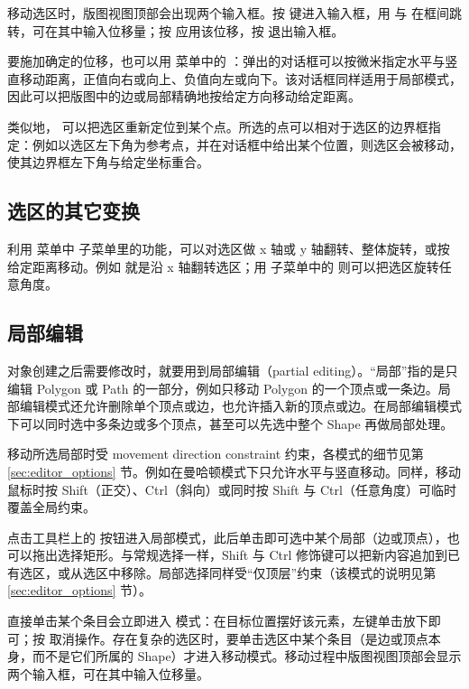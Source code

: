 移动选区时，版图视图顶部会出现两个输入框。按  键进入输入框，用  与  在框间跳转，可在其中输入位移量；按  应用该位移，按  退出输入框。

要施加确定的位移，也可以用  菜单中的 ：弹出的对话框可以按微米指定水平与竖直移动距离，正值向右或向上、负值向左或向下。该对话框同样适用于局部模式，因此可以把版图中的边或局部精确地按给定方向移动给定距离。

类似地， 可以把选区重新定位到某个点。所选的点可以相对于选区的边界框指定：例如以选区左下角为参考点，并在对话框中给出某个位置，则选区会被移动，使其边界框左下角与给定坐标重合。

\subsection{选区的其它变换}\label{sec:trans_sel}

利用  菜单中  子菜单里的功能，可以对选区做 x 轴或 y 轴翻转、整体旋转，或按给定距离移动。例如  就是沿 x 轴翻转选区；用  子菜单中的  则可以把选区旋转任意角度。

\subsection{局部编辑}\label{sec:partial}

对象创建之后需要修改时，就要用到局部编辑（partial editing）。“局部”指的是只编辑 Polygon 或 Path 的一部分，例如只移动 Polygon 的一个顶点或一条边。局部编辑模式还允许删除单个顶点或边，也允许插入新的顶点或边。在局部编辑模式下可以同时选中多条边或多个顶点，甚至可以先选中整个 Shape 再做局部处理。

移动所选局部时受 movement direction constraint 约束，各模式的细节见第 \ref{sec:editor_options} 节。例如在曼哈顿模式下只允许水平与竖直移动。同样，移动鼠标时按 Shift（正交）、Ctrl（斜向）或同时按 Shift 与 Ctrl（任意角度）可临时覆盖全局约束。

点击工具栏上的  按钮进入局部模式，此后单击即可选中某个局部（边或顶点），也可以拖出选择矩形。与常规选择一样，Shift 与 Ctrl 修饰键可以把新内容追加到已有选区，或从选区中移除。局部选择同样受“仅顶层”约束（该模式的说明见第 \ref{sec:editor_options} 节）。

直接单击某个条目会立即进入  模式：在目标位置摆好该元素，左键单击放下即可；按  取消操作。存在复杂的选区时，要单击选区中某个条目（是边或顶点本身，而不是它们所属的 Shape）才进入移动模式。移动过程中版图视图顶部会显示两个输入框，可在其中输入位移量。

